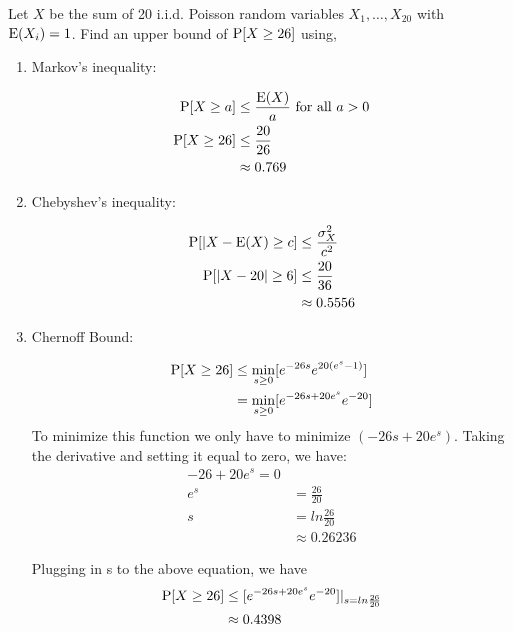 \question Let $X$ be the sum of 20 i.i.d. Poisson random variables $X_1, 
\dotsc, X_{20}$ with $\E(X_i) = 1$. Find an upper bound of $\P[X \geq 26]$ 
using,
\begin{enumerate}[label=(\alph*)]
\item Markov's inequality:
\begin{solution}[3cm]
\begin{equation}
\begin{split}
\P[X \geq a] &\leq \frac{\E(X)}{a} \text{ for all }a > 0 \nonumber \\ \nonumber
\P[X \geq 26] &\leq \frac{20}{26}\\
&\approx 0.769
\end{split}
\end{equation}
\end{solution}

\item Chebyshev's inequality:
\begin{solution}[3cm]
\begin{equation}
\begin{split}
\P[|X - \E(X) \geq c] &\leq \frac{\sigma_X^2}{c^2} \\ \nonumber
\P[|X - 20| \geq 6] &\leq \frac{20}{36} \\
&\approx 0.5556
\end{split}
\end{equation}
\end{solution}

\item Chernoff Bound:
\begin{solution}[3 cm]
\begin{equation}
\begin{split}
\P[X \geq 26] &\leq \min_{s\geq 0} [e^{-26s}e^{20(e^s - 1)}] \\ \nonumber
&= \min_{s\geq 0} [e^{-26s + 20e^s} e^{-20}]
\end{split}
\end{equation}
To minimize this function we only have to minimize $(-26s + 20e^s)$. 
Taking the derivative and setting it equal to zero, we have:
\begin{equation}
\begin{split}
-26 + 20e^s = 0 \\ \nonumber
e^s &= \frac{26}{20} \\
s &= ln \frac{26}{20} \\
&\approx 0.26236
\end{split}
\end{equation}

Plugging in s to the above equation, we have
\begin{equation}
\begin{split}
\P[X \geq 26] &\leq [e^{-26s + 20e^s} e^{-20}] \rvert_{s = ln 
\frac{26}{20}}\nonumber \\
&\approx 0.4398
\end{split}
\end{equation}
\end{solution}

\end{enumerate}